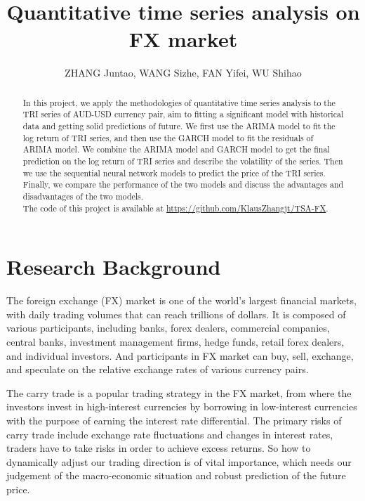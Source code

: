 \documentclass[runningheads]{llncs}
\begin{document}
\title{Quantitative time series analysis on FX market}
\author{ZHANG Juntao, WANG Sizhe, FAN Yifei, WU Shihao}
\maketitle

\begin{abstract}
    In this project, we apply the methodologies of quantitative time series analysis to the TRI series of AUD-USD currency pair, aim to fitting a significant model with historical data and getting solid predictions of future. 
    We first use the ARIMA model to fit the log return of TRI series, and then use the GARCH model to fit the residuals of ARIMA model. 
    We combine the ARIMA model and GARCH model to get the final prediction on the log return of TRI series and describe the volatility of the series. 
    Then we use the sequential neural network models to predict the price of the TRI series. 
    Finally, we compare the performance of the two models and discuss the advantages and disadvantages of the two models.\\
    The code of this project is available at \url{https://github.com/KlausZhangjt/TSA-FX}.
\end{abstract}

\section{Research Background}

The foreign exchange (FX) market is one of the world's largest financial markets, with daily trading volumes that can reach trillions of dollars. It is composed of various participants, including banks, forex dealers, commercial companies, central banks, investment management firms, hedge funds, retail forex dealers, and individual investors. And participants in FX market can buy, sell, exchange, and speculate on the relative exchange rates of various currency pairs.

The carry trade is a popular trading strategy in the FX market\cite{heath2007evidence}, from where the investors invest in high-interest currencies by borrowing in low-interest currencies with the purpose of earning the interest rate differential. The primary risks of carry trade include exchange rate fluctuations and changes in interest rates, traders have to take risks in order to achieve excess returns. So how to dynamically adjust our trading direction is of vital importance\cite{cenedese2014foreign}, which needs our judgement of the macro-economic situation and robust prediction of the future price.
\end{document}

